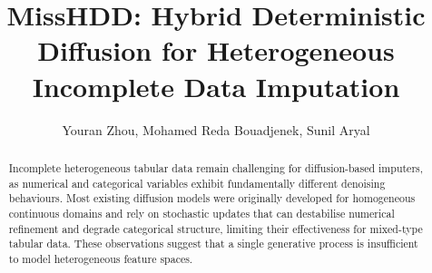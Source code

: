 \documentclass[times, review, 10pt]{elsarticle}
\begin{document}
\begin{frontmatter}



\title{MissHDD: Hybrid Deterministic Diffusion for Heterogeneous Incomplete Data Imputation}


\author{Youran Zhou, Mohamed Reda Bouadjenek, Sunil Aryal} %



\begin{abstract}
Incomplete heterogeneous tabular data remain challenging for diffusion-based imputers, as numerical and categorical variables exhibit fundamentally different denoising behaviours. Most existing diffusion models were originally developed for homogeneous continuous domains and rely on stochastic updates that can destabilise numerical refinement and degrade categorical structure, limiting their effectiveness for mixed-type tabular data. These observations suggest that a single generative process is insufficient to model heterogeneous feature spaces.


\end{abstract}
\end{frontmatter}
\end{document}
